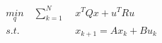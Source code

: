 \documentclass[preview]{standalone}
\begin{document}
\begin{align*}
\underset{q}{min}  \quad \sum_{k=1}^N \; &x^TQx + u^T R u \\ s.t. \quad &x_{k+1} = Ax_k + Bu_k
\end{align*}
\end{document}
